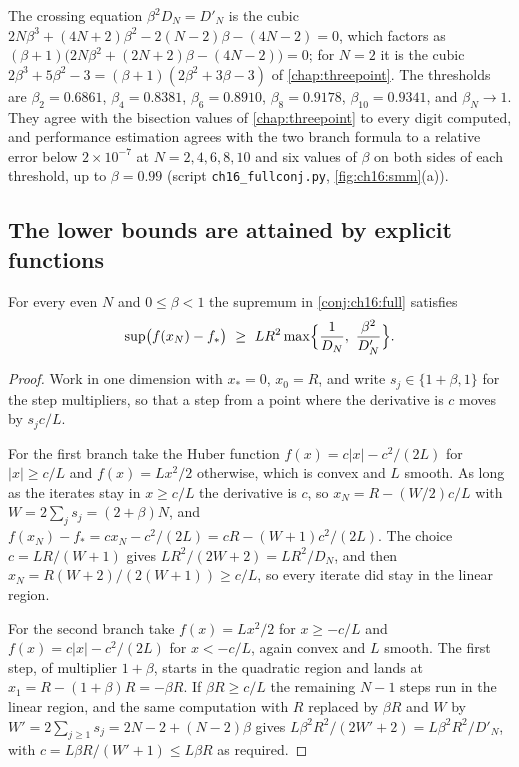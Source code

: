 The crossing equation $\beta^2D_N=D'_N$ is the cubic
$2N\beta^3+(4N+2)\beta^2-2(N-2)\beta-(4N-2)=0$, which factors as
$(\beta+1)\bigl(2N\beta^2+(2N+2)\beta-(4N-2)\bigr)=0$; for $N=2$ it is the cubic
$2\beta^3+5\beta^2-3=(\beta+1)(2\beta^2+3\beta-3)$ of \cref{chap:threepoint}. The
thresholds are $\beta_2=0.6861$, $\beta_4=0.8381$, $\beta_6=0.8910$,
$\beta_8=0.9178$, $\beta_{10}=0.9341$, and $\beta_N\to1$. They agree with the
bisection values of \cref{chap:threepoint} to every digit computed, and
performance estimation agrees with the two branch formula to a relative error
below $2\times10^{-7}$ at $N=2,4,6,8,10$ and six values of $\beta$ on both sides
of each threshold, up to $\beta=0.99$ (script \texttt{ch16\_fullconj.py},
\cref{fig:ch16:smm}(a)).

\subsection{The lower bounds are attained by explicit functions}

\begin{proposition}\label{prop:ch16:lower}
For every even $N$ and $0\le\beta<1$ the supremum in \cref{conj:ch16:full} satisfies
\[
  \sup\bigl(f(x_N)-f_*\bigr)\ \ge\ LR^2\max\Bigl\{\frac1{D_N},\ \frac{\beta^2}{D'_N}\Bigr\}.
\]
\end{proposition}

\begin{proof}
Work in one dimension with $x_*=0$, $x_0=R$, and write $s_j\in\{1+\beta,1\}$ for the
step multipliers, so that a step from a point where the derivative is $c$
moves by $s_jc/L$.

For the first branch take the Huber function $f(x)=c|x|-c^2/(2L)$ for
$|x|\ge c/L$ and $f(x)=Lx^2/2$ otherwise, which is convex and $L$ smooth. As long
as the iterates stay in $x\ge c/L$ the derivative is $c$, so
$x_N=R-(W/2)c/L$ with $W=2\sum_js_j=(2+\beta)N$, and
$f(x_N)-f_*=cx_N-c^2/(2L)=cR-(W+1)c^2/(2L)$. The choice $c=LR/(W+1)$ gives
$LR^2/(2W+2)=LR^2/D_N$, and then $x_N=R(W+2)/(2(W+1))\ge c/L$, so every iterate
did stay in the linear region.

For the second branch take $f(x)=Lx^2/2$ for $x\ge-c/L$ and $f(x)=c|x|-c^2/(2L)$
for $x<-c/L$, again convex and $L$ smooth. The first step, of multiplier
$1+\beta$, starts in the quadratic region and lands at $x_1=R-(1+\beta)R=-\beta R$.
If $\beta R\ge c/L$ the remaining $N-1$ steps run in the linear region, and the
same computation with $R$ replaced by $\beta R$ and $W$ by
$W'=2\sum_{j\ge1}s_j=2N-2+(N-2)\beta$ gives $L\beta^2R^2/(2W'+2)=L\beta^2R^2/D'_N$, with
$c=L\beta R/(W'+1)\le L\beta R$ as required.
\end{proof}

